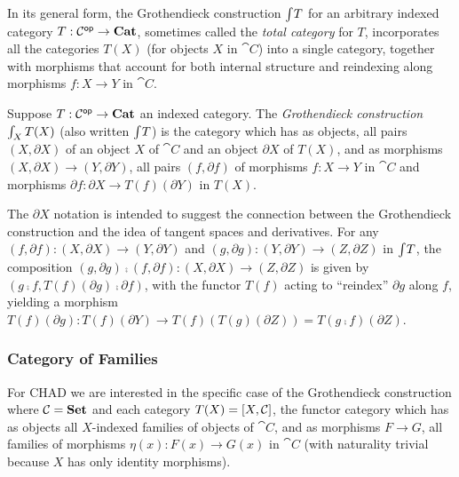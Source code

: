 In its general form, the Grothendieck construction $\int_{}T$ for an arbitrary indexed category $T:
\mathcal{C}^{\mathsf{op}} \to \mathbf{Cat}$, sometimes called the \emph{total category} for $T$, incorporates all the categories
$T(X)$ (for objects $X$ in $\cat{C}$) into a single category, together with morphisms that account for both
internal structure and reindexing along morphisms $f: X \to Y$ in $\cat{C}$.

\begin{definition}
\label{def:Grothendieck}
Suppose $T: \mathcal{C}^{\mathsf{op}} \to \mathbf{Cat}$ an indexed category. The \emph{Grothendieck construction}
$\int_{X}T(X)$ (also written $\int_{}T$) is the category which has as objects, all pairs $(X,
\partial X)$ of an object $X$ of $\cat{C}$ and an object $\partial X$ of $T(X)$, and as morphisms $(X,
\partial X) \to (Y, \partial Y)$, all pairs $(f, \partial f)$ of morphisms $f: X \to Y$ in $\cat{C}$ and
morphisms $\partial f: \partial X \to T(f)(\partial Y)$ in $T(X)$.
\end{definition}

\noindent The $\partial X$ notation is intended to suggest the connection between the Grothendieck
construction and the idea of tangent spaces and derivatives. For any $(f, \partial f): (X, \partial X) \to (Y,
\partial Y)$ and $(g, \partial g): (Y, \partial Y) \to (Z, \partial Z)$ in $\int_{}T$, the composition
$(g, \partial g) \comp (f, \partial f): (X, \partial X) \to (Z, \partial Z)$ is given by $(g \comp f,
T(f)(\partial g) \comp \partial f)$, with the functor $T(f)$ acting to ``reindex'' $\partial g$ along $f$,
yielding a morphism $T(f)(\partial g): T(f)(\partial Y) \to T(f)(T(g)(\partial Z)) = T(g \comp f)(\partial
Z)$.

\subsubsection{Category of Families}
\label{sec:Fam}

For CHAD we are interested in the specific case of the Grothendieck construction where $\mathcal{C} = \mathbf{Set}$ and
each category $T(X) = [X,\mathcal{C}]$, the functor category which has as objects all $X$-indexed families
of objects of $\cat{C}$, and as morphisms $F \to G$, all families of morphisms $\eta(x): F(x) \to G(x)$ in
$\cat{C}$ (with naturality trivial because $X$ has only identity morphisms).

%

